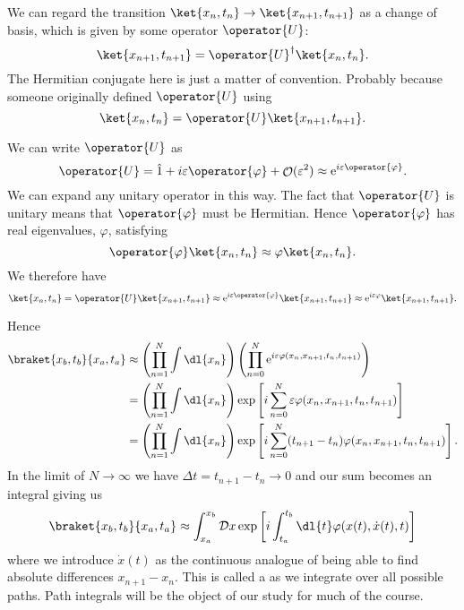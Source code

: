 \documentclass[fleqn]{NotesClass}
\newcommand*{\e}{\mathrm{e}}
\newcommand*{\idop}{\hat{1}}
\newcommand*{\hermit}{\dagger}
\newcommand*{\order}{\mathop{\mathcal{O}}}
\begin{document}
    We can regard the transition \(\ket{x_n, t_n} \to \ket{x_{n+1}, t_{n+1}}\) as a change of basis, which is given by some operator \(\operator{U}\):
    \begin{equation}
        \ket{x_{n+1}, t_{n+1}} = \operator{U}^\hermit \ket{x_n, t_n}.
    \end{equation}
    The Hermitian conjugate here is just a matter of convention.
    Probably because someone originally defined \(\operator{U}\) using
    \begin{equation}
        \ket{x_n, t_n} = \operator{U}\ket{x_{n+1}, t_{n+1}}.
    \end{equation}
    
    We can write \(\operator{U}\) as
    \begin{equation}
        \operator{U} = \idop + i\varepsilon\operator{\varphi} + \order(\varepsilon^2) \approx \e^{i\varepsilon\operator{\varphi}}.
    \end{equation}
    We can expand any unitary operator in this way.
    The fact that \(\operator{U}\) is unitary means that \(\operator{\varphi}\) must be Hermitian.
    Hence \(\operator{\varphi}\) has real eigenvalues, \(\varphi\), satisfying
    \begin{equation}
        \operator{\varphi} \ket{x_n, t_n} \approx \varphi \ket{x_n, t_n}.
    \end{equation}
    We therefore have
    \begin{equation}
        \ket{x_n, t_n} = \operator{U}\ket{x_{n+1}, t_{n+1}} \approx \e^{i\varepsilon\operator{\varphi}}\ket{x_{n+1}, t_{n+1}} \approx \e^{i\varepsilon\varphi}\ket{x_{n+1}, t_{n+1}}.
    \end{equation}
    
    Hence
    \begin{align}
        \braket{x_b, t_b}{x_a, t_a} &\approx \left( \prod_{n=1}^{N} \int \dl{x_n} \right) \left( \prod_{n=0}^{N} \e^{i\varepsilon\varphi(x_n, x_{n+1}, t_n, t_{n+1})} \right)\\
        &= \left( \prod_{n=1}^{N} \int\dl{x_n} \right)\exp\left[ i\sum_{n=0}^{N} \varepsilon\varphi(x_n, x_{n+1}, t_n, t_{n+1}) \right]\\
        &= \left( \prod_{n=1}^{N} \int\dl{x_n} \right)\exp\left[ i\sum_{n=0}^{N} (t_{n+1} - t_n) \varphi(x_n, x_{n+1}, t_n, t_{n+1}) \right].
    \end{align}
    In the limit of \(N \to \infty\) we have \(\Delta t = t_{n+1} - t_n \to 0\) and our sum becomes an integral giving us
    \begin{equation}\label{eqn:integral over paths}
        \braket{x_b, t_b}{x_a, t_a} \approx \int_{x_a}^{x_b} \DL{x} \exp\left[ i\int_{t_a}^{t_b} \dl{t} \varphi(x(t), \dot{x}(t), t) \right]
    \end{equation}
    where we introduce \(\dot{x}(t)\) as the continuous analogue of being able to find absolute differences \(x_{n+1} - x_n\).
    This is called a  as we integrate over all possible paths.
    Path integrals will be the object of our study for much of the course.
    
\end{document}
